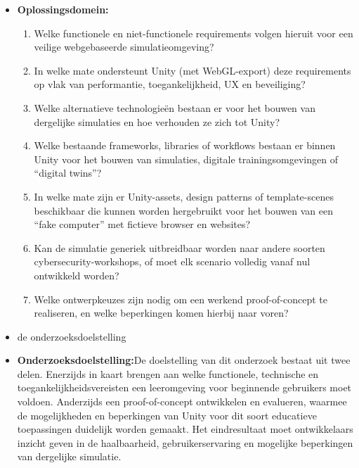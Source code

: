 \begin{itemize}
    \item \colorbox{deelvraagoplossing}{\parbox{\dimexpr\linewidth-2\fboxsep}{\textbf{Oplossingsdomein:}
    \begin{enumerate}
        \item Welke functionele en niet-functionele requirements volgen hieruit voor een veilige webgebaseerde simulatieomgeving?
        \item In welke mate ondersteunt Unity (met WebGL-export) deze requirements op vlak van performantie, toegankelijkheid, UX en beveiliging?
        \item Welke alternatieve technologieën bestaan er voor het bouwen van dergelijke simulaties en hoe verhouden ze zich tot Unity?
        \item Welke bestaande frameworks, libraries of workflows bestaan er binnen Unity voor het bouwen van simulaties, digitale trainingsomgevingen of “digital twins”?
        \item In welke mate zijn er Unity-assets, design patterns of template-scenes beschikbaar die kunnen worden hergebruikt voor het bouwen van een “fake computer” met fictieve browser en websites?
        \item Kan de simulatie generiek uitbreidbaar worden naar andere soorten cybersecurity-workshops, of moet elk scenario volledig vanaf nul ontwikkeld worden?
        \item Welke ontwerpkeuzes zijn nodig om een werkend proof-of-concept te realiseren, en welke beperkingen komen hierbij naar voren?
    \end{enumerate}}}


  \item de onderzoeksdoelstelling
\item \colorbox{doelstelling}{\parbox{\dimexpr\linewidth-2\fboxsep}{\textbf{Onderzoeksdoelstelling:}De doelstelling van dit onderzoek bestaat uit twee delen. Enerzijds in kaart brengen aan welke functionele, technische en toegankelijkheidsvereisten een leeromgeving voor beginnende gebruikers moet voldoen. Anderzijds een proof-of-concept ontwikkelen en evalueren, waarmee de mogelijkheden en beperkingen van Unity voor dit soort educatieve toepassingen duidelijk worden gemaakt. Het eindresultaat moet ontwikkelaars inzicht geven in de haalbaarheid, gebruikerservaring en mogelijke beperkingen van dergelijke simulatie.}}
\end{itemize}


